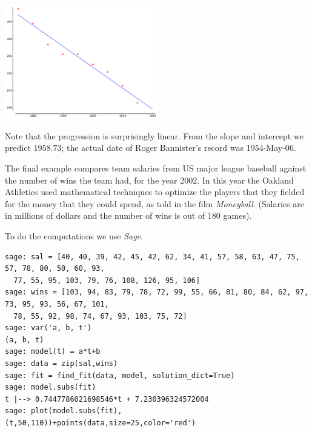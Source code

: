 \begin{center}
  \includegraphics[width=0.5\textwidth]{four_minute_mile.pdf}
\end{center}
Note that the progression is surprisingly linear.
From the slope and intercept we predict $1958.73$; 
the actual date of Roger Bannister's record was 1954-May-06.

The final example
compares team salaries from US major league baseball 
against the number of wins the team had, for the year 2002.
In this year the Oakland Athletics 
used mathematical techniques to optimize the players that they fielded
for the money that they could spend, as told in  
the film \textit{Moneyball}.
(Salaries are in millions of dollars and the number of wins
is out of 180 games). 

To do the computations we use \textit{Sage}. 
\begin{lstlisting}
sage: sal = [40, 40, 39, 42, 45, 42, 62, 34, 41, 57, 58, 63, 47, 75, 57, 78, 80, 50, 60, 93, 
  77, 55, 95, 103, 79, 76, 108, 126, 95, 106]
sage: wins = [103, 94, 83, 79, 78, 72, 99, 55, 66, 81, 80, 84, 62, 97, 73, 95, 93, 56, 67, 101, 
  78, 55, 92, 98, 74, 67, 93, 103, 75, 72]
sage: var('a, b, t')
(a, b, t)
sage: model(t) = a*t+b
sage: data = zip(sal,wins)
sage: fit = find_fit(data, model, solution_dict=True)
sage: model.subs(fit)
t |--> 0.7447786021698546*t + 7.230396324572004
sage: plot(model.subs(fit),(t,50,110))+points(data,size=25,color='red')
\end{lstlisting}

